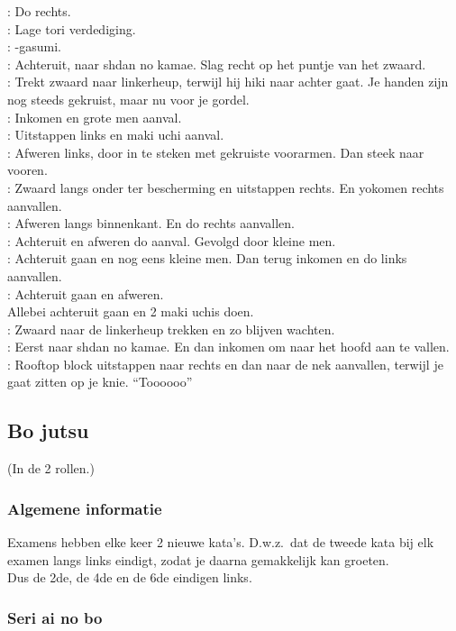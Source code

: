 \pB: Do rechts.\\
\pA: Lage tori verdediging.\\
\pB: -gasumi.\\
\pA: Achteruit, naar shdan no kamae. Slag recht op het puntje van het zwaard.\\
\pB: Trekt zwaard naar linkerheup, terwijl hij hiki naar achter gaat. Je handen zijn nog steeds gekruist, maar nu voor je gordel.\\
\pA: Inkomen en grote men aanval.\\
\pB: Uitstappen links en maki uchi aanval.\\
\pA: Afweren links, door in te steken met gekruiste voorarmen. Dan steek naar vooren.\\
\pB: Zwaard langs onder ter bescherming en uitstappen rechts. En yokomen rechts aanvallen.\\
\pA: Afweren langs binnenkant. En do rechts aanvallen.\\
\pB: Achteruit en afweren do aanval. Gevolgd door kleine men.\\
\pA: Achteruit gaan en nog eens kleine men. Dan terug inkomen en do links aanvallen.\\
\pB: Achteruit gaan en afweren.\\
Allebei achteruit gaan en 2 maki uchis doen.\\
\pA: Zwaard naar de linkerheup trekken en zo blijven wachten.\\
\pB: Eerst naar shdan no kamae. En dan inkomen om naar het hoofd aan te vallen.\\
\pA: Rooftop block uitstappen naar rechts en dan naar de nek aanvallen, terwijl je gaat zitten op je knie. ``Toooooo''

\subsection{Bo jutsu}
(In de 2 rollen.)

\subsubsection{Algemene informatie}

Examens hebben elke keer 2 nieuwe kata's. D.w.z.\ dat de tweede kata bij elk examen langs links eindigt, zodat je daarna gemakkelijk kan groeten.\\
Dus de 2de, de 4de en de 6de eindigen links.

\subsubsection{Seri ai no bo}

